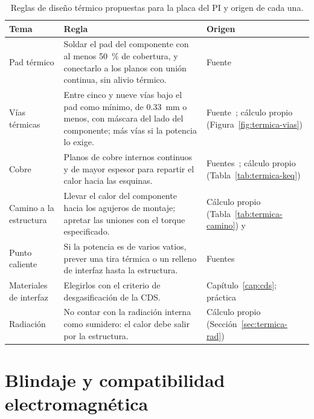 \begin{table}[H]
  \centering
  \caption[Reglas de diseño térmico propuestas.]{Reglas de diseño térmico propuestas para la placa del PI y origen de cada una.}\label{tab:termica-reglas}
  \begin{tabular}{@{}>{\raggedright\arraybackslash}p{3.1cm}>{\raggedright\arraybackslash}p{7.2cm}>{\raggedright\arraybackslash}p{4.3cm}@{}}
    \toprule
    Tema & Regla & Origen \\
    \midrule
    Pad térmico & Soldar el pad del componente con al menos \SI{50}{\percent} de cobertura, y conectarlo a los planos con unión continua, sin alivio térmico. & Fuente~\cite{tislma002} \\
    Vías térmicas & Entre cinco y nueve vías bajo el pad como mínimo, de \SI{0,33}{\milli\metre} o menos, con máscara del lado del componente; más vías si la potencia lo exige. & Fuente~\cite{tislma002}; cálculo propio (Figura~\ref{fig:termica-vias}) \\
    Cobre & Planos de cobre internos continuos y de mayor espesor para repartir el calor hacia las esquinas. & Fuentes~\cite{nasasoa}; cálculo propio (Tabla~\ref{tab:termica-keq}) \\
    Camino a la estructura & Llevar el calor del componente hacia los agujeros de montaje; apretar las uniones con el torque especificado. & Cálculo propio (Tabla~\ref{tab:termica-camino}) y~\cite{steinfeld23} \\
    Punto caliente & Si la potencia es de varios vatios, prever una tira térmica o un relleno de interfaz hasta la estructura. & Fuentes~\cite{guerra18,nasasoa} \\
    Materiales de interfaz & Elegirlos con el criterio de desgasificación de la CDS\@. & Capítulo~\ref{cap:cds}; práctica \\
    Radiación & No contar con la radiación interna como sumidero: el calor debe salir por la estructura. & Cálculo propio (Sección~\ref{sec:termica-rad}) \\
    \bottomrule
  \end{tabular}
\end{table}


\section{Blindaje y compatibilidad electromagnética}\label{sec:emi}

